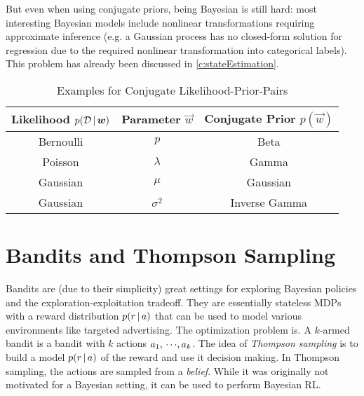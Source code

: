 	But even when using conjugate priors, being Bayesian is still hard: most interesting Bayesian models include nonlinear transformations requiring approximate inference (e.g. a Gaussian process has no closed-form solution for regression due to the required nonlinear transformation into categorical labels). This problem has already been discussed in \autoref{c:stateEstimation}.

	\begin{table}
		\centering
		\begin{tabular}{c|c|c}
			\textbf{Likelihood} \( p(\mathcal{D} \,\vert\, \bm{w}) \) & \textbf{Parameter} \( \vec{w} \) & \textbf{Conjugate Prior} \( p(\vec{w}) \) \\ \hline
			                       Bernoulli                        &              \(p\)               &                   Beta                    \\
			                        Poisson                         &           \(\lambda\)            &                   Gamma                   \\
			                       Gaussian                         &             \(\mu\)              &                 Gaussian                  \\
			                       Gaussian                         &           \(\sigma^2\)           &               Inverse Gamma
		\end{tabular}
		\caption{Examples for Conjugate Likelihood-Prior-Pairs}
		\label{tab:conjugatePrior}
	\end{table}

	\section{Bandits and Thompson Sampling}
		Bandits are (due to their simplicity) great settings for exploring Bayesian policies and the exploration-exploitation tradeoff. They are essentially stateless MDPs with a reward distribution \( p(r \,\vert\, a) \) that can be used to model various environments like targeted advertising. The optimization problem is. A \(k\)-armed bandit is a bandit with \(k\) actions \( a_1,\,\cdots\!,a_k \). The idea of \emph{Thompson sampling} is to build a model \( p(r \,\vert\, a) \) of the reward and use it decision making. In Thompson sampling, the actions are sampled from a \emph{belief}. While it was originally not motivated for a Bayesian setting, it can be used to perform Bayesian RL.

